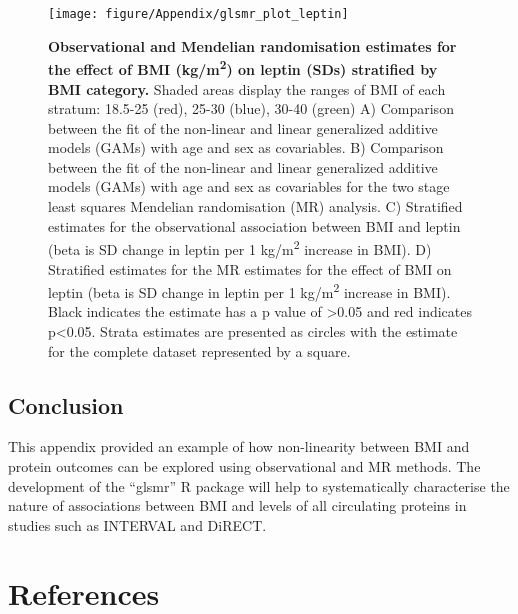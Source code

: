 \documentclass[11pt,twoside]{bristolthesis}
\begin{document}
\begin{figure}

{\centering \texttt{[image: figure/Appendix/glsmr\_plot\_leptin]} 

}

\caption[Observational and Mendelian randomisation estimates for the effect of BMI on leptin stratified by BMI category.]{\textbf{Observational and Mendelian randomisation estimates for the effect of BMI (kg/m\textsuperscript{2}) on leptin (SDs) stratified by BMI category.} Shaded areas display the ranges of BMI of each stratum: 18.5-25 (red), 25-30 (blue), 30-40 (green) A) Comparison between the fit of the non-linear and linear generalized additive models (GAMs) with age and sex as covariables. B) Comparison between the fit of the non-linear and linear generalized additive models (GAMs) with age and sex as covariables for the two stage least squares Mendelian randomisation (MR) analysis. C) Stratified estimates for the observational association between BMI and leptin (beta is SD change in leptin per 1 kg/m\textsuperscript{2} increase in BMI). D) Stratified estimates for the MR estimates for the effect of BMI on leptin (beta is SD change in leptin per 1 kg/m\textsuperscript{2} increase in BMI). Black indicates the estimate has a p value of \textgreater0.05 and red indicates p\textless0.05. Strata estimates are presented as circles with the estimate for the complete dataset represented by a square.}\label{fig:leptin-glsmr}
\end{figure}
\hypertarget{conclusion}{%
\section{Conclusion}\label{conclusion}}

This appendix provided an example of how non-linearity between BMI and protein outcomes can be explored using observational and MR methods. The development of the ``glsmr'' R package will help to systematically characterise the nature of associations between BMI and levels of all circulating proteins in studies such as INTERVAL and DiRECT.

\backmatter

\hypertarget{references}{%
\chapter*{References}\label{references}}

\end{document}
